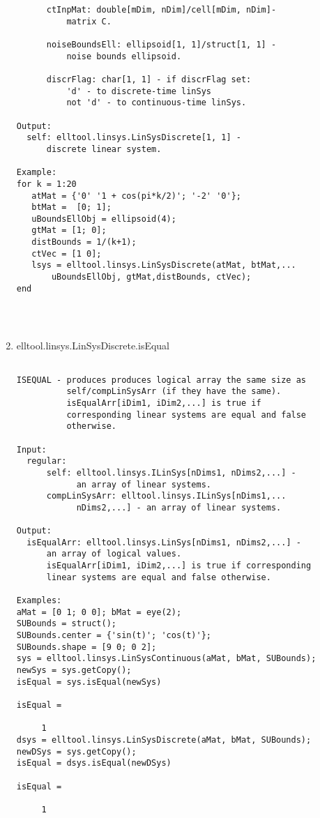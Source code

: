 \begin{enumerate}
\begin{lstlisting}
      ctInpMat: double[mDim, nDim]/cell[mDim, nDim]-
          matrix C.

      noiseBoundsEll: ellipsoid[1, 1]/struct[1, 1] -
          noise bounds ellipsoid.

      discrFlag: char[1, 1] - if discrFlag set:
          'd' - to discrete-time linSys
          not 'd' - to continuous-time linSys.

Output:
  self: elltool.linsys.LinSysDiscrete[1, 1] -
      discrete linear system.

Example:
for k = 1:20
   atMat = {'0' '1 + cos(pi*k/2)'; '-2' '0'};
   btMat =  [0; 1];
   uBoundsEllObj = ellipsoid(4);
   gtMat = [1; 0];
   distBounds = 1/(k+1);
   ctVec = [1 0];
   lsys = elltool.linsys.LinSysDiscrete(atMat, btMat,...
       uBoundsEllObj, gtMat,distBounds, ctVec);
end




\end{lstlisting}
\fontfamily{\familydefault}
\selectfont
\item {elltool.linsys.LinSysDiscrete.isEqual}
\selectfont
\begin{lstlisting}

ISEQUAL - produces produces logical array the same size as
          self/compLinSysArr (if they have the same).
          isEqualArr[iDim1, iDim2,...] is true if
          corresponding linear systems are equal and false
          otherwise.

Input:
  regular:
      self: elltool.linsys.ILinSys[nDims1, nDims2,...] -
            an array of linear systems.
      compLinSysArr: elltool.linsys.ILinSys[nDims1,...
            nDims2,...] - an array of linear systems.

Output:
  isEqualArr: elltool.linsys.LinSys[nDims1, nDims2,...] -
      an array of logical values.
      isEqualArr[iDim1, iDim2,...] is true if corresponding
      linear systems are equal and false otherwise.

Examples:
aMat = [0 1; 0 0]; bMat = eye(2);
SUBounds = struct();
SUBounds.center = {'sin(t)'; 'cos(t)'};
SUBounds.shape = [9 0; 0 2];
sys = elltool.linsys.LinSysContinuous(aMat, bMat, SUBounds);
newSys = sys.getCopy();
isEqual = sys.isEqual(newSys)

isEqual =

     1
dsys = elltool.linsys.LinSysDiscrete(aMat, bMat, SUBounds);
newDSys = sys.getCopy();
isEqual = dsys.isEqual(newDSys)

isEqual =

     1





\end{lstlisting}
\end{enumerate}
